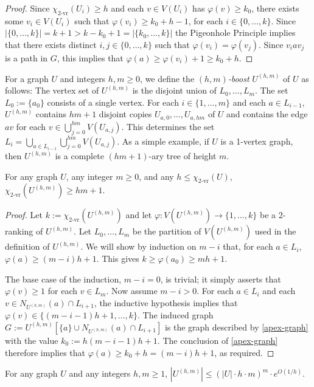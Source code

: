 \documentclass[kpfonts]{patmorin}
\newcommand{\rn}[1]{\chi_{\operatorname{#1-vr}}}
\newcommand{\trn}{\rn{2}}
\theoremstyle{named}
\begin{document}
\begin{proof}
    Since $\trn(U_i)\ge h$ and each $v\in V(U_i)$ has $\varphi(v)\ge k_0$, there exists some $v_i\in V(U_i)$ such that $\varphi(v_i)\ge k_0+h-1$, for each $i\in\{0,\ldots,k\}$.  Since $|\{0,\ldots,k\}|=k+1>k-k_0+1=|\{k_0,\ldots,k\}|$ the Pigeonhole Principle implies that there exists distinct $i,j\in\{0,\ldots,k\}$ such that $\varphi(v_i)=\varphi(v_j)$.  Since $v_i a v_j$ is a path in $G$, this implies that $\varphi(a)\ge \varphi(v_i)+1\ge k_0+h$.
\end{proof}

For a graph $U$ and integers $h,m\ge 0$, we define the \emph{$(h,m)$-boost} $U^{(h,m)}$ of $U$ as follows: The vertex set of $U^{(h,m)}$ is the disjoint union of $L_0,\ldots,L_m$.  The set $L_0:=\{a_0\}$ consists of a single vertex. For each $i\in\{1,\ldots,m\}$ and each $a\in L_{i-1}$, $U^{(h,m)}$ contains $hm+1$ disjoint copies $U_{a,0},\ldots,U_{a,hm}$ of $U$ and contains the edge $av$ for each $v\in\bigcup_{j=0}^{hm} V(U_{a,j})$.  This determines the set $L_i=\bigcup_{a\in L_{i-1}}\bigcup_{j=0}^{hm} V(U_{a,j})$.  As a simple example, if $U$ is a 1-vertex graph, then $U^{(h,m)}$ is a complete $(hm+1)$-ary tree of height $m$.

\begin{lem}\label{boost}
    For any graph $U$, any integer $m\ge 0$, and any $h\le\trn(U)$, $\trn(U^{(h,m)})\ge hm +1$.
\end{lem}

\begin{proof}
    Let $k:=\trn(U^{(h,m)})$ and let $\varphi:V(U^{(h,m)})\to\{1,\ldots,k\}$ be a 2-ranking of $U^{(h,m)}$.  Let $L_0,\ldots,L_{m}$ be the partition of $V(U^{(h,m)})$ used in the definition of $U^{(h,m)}$. We will show by induction on $m-i$ that, for each $a\in L_{i}$, $\varphi(a)\ge(m-i)h+1$. This gives $k\ge \varphi(a_0)\ge m h+1$.

    The base case of the induction, $m-i=0$, is trivial; it simply asserts that $\varphi(v)\ge 1$ for each $v\in L_m$.  Now assume $m-i > 0$.  For each $a\in L_i$ and each  $v\in N_{U^{(h,m)}}(a)\cap L_{i+1}$, the inductive hypothesis implies that $\varphi(v)\in\{(m-i-1)h+1,\ldots,k\}$.  The induced graph $G:=U^{(h,m)}[\{a\}\cup N_{U^{(h,m)}}(a)\cap L_{i+1}]$ is the graph described by \cref{apex-graph} with the value $k_0:=h(m-i-1)h+1$.  The conclusion of \cref{apex-graph} therefore implies that $\varphi(a)\ge k_0+h=(m-i)h+1$, as required.
\end{proof}

\begin{lem}\label{boost-size}
    For any graph $U$ and any integers $h,m \ge 1$, $|U^{(h,m)}| \le (|U|\cdot h\cdot m)^{m}\cdot e^{O(1/h)}$.
\end{lem}
\end{document}
